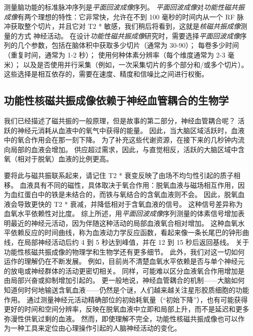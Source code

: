 测量脑功能的标准脉冲序列是\textit{平面回波成像}序列。 
\textit{平面回波成像}对\textit{功能性磁共振成像}有两个理想的特性：它非常快，允许在不到 100 毫秒的时间内从一个 RF 脉冲获取整个切片，并且它对 T2 * 敏感，我们稍后将看到，这就是\textit{核磁共振成像}测量的方式 神经活动。 
在设计\textit{功能性磁共振成像}研究时，需要选择\textit{平面回波成像}序列的几个参数，包括在脑体积中获取多少切片（通常为 30-90）； 
每卷多少时间（重复时间，通常为 1-2 秒）； 使用何种体素分辨率（每个维度通常为 2-3 毫米）； 
以及是否使用并行采集（例如，一次采集切片的多个部分和/或多个切片）。 
这些选择是相互依存的，需要在速度、精度和信噪比之间进行权衡。



\subsection{功能性核磁共振成像依赖于神经血管耦合的生物学}

我们已经描述了磁共振的一般原理，但是故事的第二部分，神经血管耦合呢？
活跃的神经元消耗从血液中的氧气中获得的能量。 
因此，当大脑区域活跃时，血液中的氧合作用会在那一刻下降。
为了补充这些代谢资源，在接下来的几秒钟内流向局部的血液会增加。
供应超过需求，因此，与直觉相反，活跃的大脑区域中含氧（相对于脱氧）血液的比例更高。


要将此与磁共振联系起来，请记住 T2 * 衰变反映了由场不均匀性引起的质子相移。 
血液具有不同的磁性，具体取决于氧合作用：脱氧血液与磁场相互作用，因为血红蛋白中的铁是未结合的，而铁与氧结合的含氧血液则不会。
因此，脱氧血液会导致更快的 T2 * 衰减，并降低相对于含氧血液的信号。
这种信号差异称为血氧水平依赖性对比度。 
综上所述，用\textit{平面回波成像}序列测量的体素信号增加表明最近的神经元活动，因为伴随这种活动的局部血液氧合相对增加。
这种血氧水平依赖反应的时间曲线，称为血液动力学反应函数，看起来像一条长尾巴的钟形曲线，在局部神经活动后约 4 到 5 秒达到峰值，并在 12 到 15 秒后返回基线。
关于功能性核磁共振成像的物理学和生物学还有更多细节。 
此外，我们对这一切如何运作的理解仍在不断发展。 
例如，目前尚不清楚血氧水平依赖是否与单个神经元的放电或神经群体的活动更密切相关。 
同样，可能难以区分血液氧合作用增加是由局部兴奋或抑制增加引起的。 
更一般地说，神经血管耦合的机制——大脑如何知道何时何地输送含氧血液——仍然是个谜，人们越来越关注星形胶质细胞的功能作用。 
通过测量神经元活动精确部位的初始耗氧量（“初始下降”），也有可能获得更好的时间和空间分辨率，反映在脱氧血液中立即和局部上升，而不是延迟和更多弥漫性供氧过剩的血液。 
然而，即使理解不完全，功能性核磁共振成像也可以作为一种工具来定位由心理操作引起的人脑神经活动的变化。



